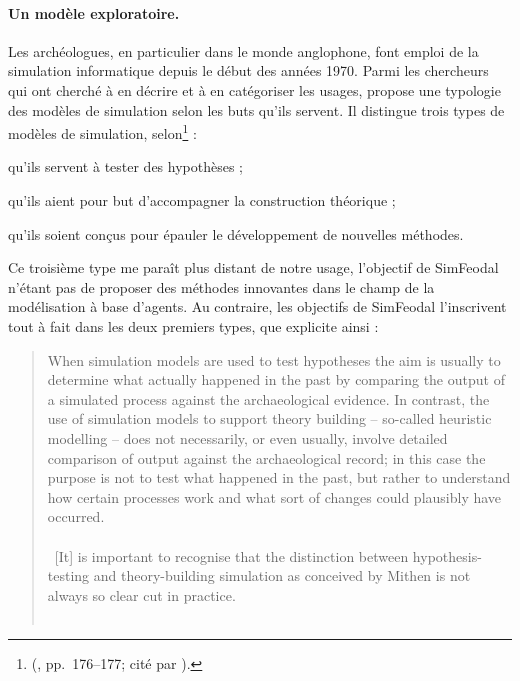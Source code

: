 \paragraph{Un modèle exploratoire.}

Les archéologues, en particulier dans le monde anglophone, font emploi de la simulation informatique depuis le début des années 1970.
Parmi les chercheurs qui ont cherché à en décrire et à en catégoriser les usages, \citeauthor{mithen2018simulating} propose une typologie des modèles de simulation selon les buts qu'ils servent.
Il distingue trois types de modèles de simulation, selon\footnote{
	\citeauthor{mithen2018simulating} \mkbibparens{\cite*{mithen2018simulating}, pp.~176--177; cité par \cite[260]{lake_trends_2014}}.
} :
\begin{compactenum}\vspace*{-0.5em}
	\item qu'ils servent à tester des hypothèses ;
	\item qu'ils aient pour but d'accompagner la construction théorique ;
	\item qu'ils soient conçus pour épauler le développement de nouvelles méthodes.
\end{compactenum}\vspace*{-0.5em}

Ce troisième type me paraît plus distant de notre usage, l'objectif de SimFeodal n'étant pas de proposer des méthodes innovantes dans le champ de la modélisation à base d'agents.
Au contraire, les objectifs de SimFeodal l'inscrivent tout à fait dans les deux premiers types, que \citeauthor{lake_trends_2014} explicite ainsi :
\begin{quotation}
\noindent \og 
When simulation models are used to test hypotheses the aim is usually to determine what actually happened in the past by comparing the output of a simulated process against the archaeological evidence.
In contrast, the use of simulation models to support theory building -- so-called heuristic modelling -- does not necessarily, or even usually, involve detailed comparison of output against the archaeological record;
in this case the purpose is not to test what happened in the past, but rather to understand how certain processes work and what sort of changes could plausibly have occurred.\\
\textelp{} \\
~[It] is important to recognise that the distinction between hypothesis-testing and theory-building simulation as conceived by Mithen is not always so clear cut in practice.
\fg{} \\
\citetrackerfalse
\mbox{}~ \hfill \cite[260]{lake_trends_2014}
\citetrackertrue
\end{quotation}

